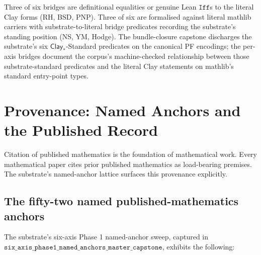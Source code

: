 \documentclass[11pt,a4paper]{amsart}
\theoremstyle{plain}
\theoremstyle{definition}
\begin{document}
Three of six bridges are definitional equalities or genuine Lean $\texttt{Iff}$s to the literal Clay forms (RH, BSD, PNP). Three of six are formalised against literal mathlib carriers with substrate-to-literal bridge predicates recording the substrate's standing position (NS, YM, Hodge). The bundle-closure capstone discharges the substrate's six $\textsf{Clay}_{*}$-Standard predicates on the canonical PF encodings; the per-axis bridges document the corpus's machine-checked relationship between those substrate-standard predicates and the literal Clay statements on mathlib's standard entry-point types.

\section{Provenance: Named Anchors and the Published Record}\label{sec:provenance}

Citation of published mathematics is the foundation of mathematical work. Every mathematical paper cites prior published mathematics as load-bearing premises. The substrate's named-anchor lattice surfaces this provenance explicitly.

\subsection{The fifty-two named published-mathematics anchors}

The substrate's six-axis Phase 1 named-anchor sweep, captured in $\texttt{six\_axis\_phase1\_named\_anchors\_master\_capstone}$, exhibits the following:
\end{document}
